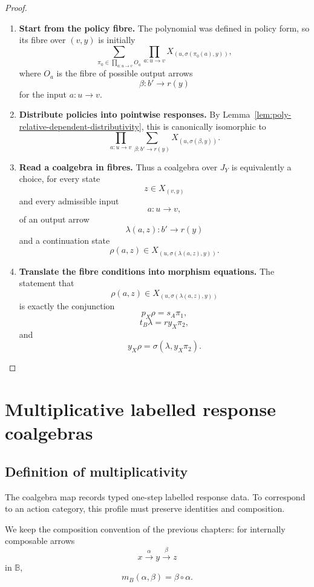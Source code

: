 \begin{proof}
\leavevmode
\begin{enumerate}
\item \textbf{Start from the policy fibre.}
The polynomial was defined in policy form, so its fibre over \((v,y)\) is
initially
\[
\sum_{\pi_0\in\prod_{a:u\to v}O_a}
\prod_{a:u\to v}
X_{(u,\sigma(\pi_0(a),y))},
\]
where \(O_a\) is the fibre of possible output arrows
\[
\beta:b'\to r(y)
\]
for the input \(a:u\to v\).

\item \textbf{Distribute policies into pointwise responses.}
By Lemma~\ref{lem:poly-relative-dependent-distributivity}, this is
canonically isomorphic to
\[
\prod_{a:u\to v}
\sum_{\beta:b'\to r(y)}
X_{(u,\sigma(\beta,y))}.
\]

\item \textbf{Read a coalgebra in fibres.}
Thus a coalgebra over \(J_Y\) is equivalently a choice, for every state
\[
z\in X_{(v,y)}
\]
and every admissible input
\[
a:u\to v,
\]
of an output arrow
\[
\lambda(a,z):b'\to r(y)
\]
and a continuation state
\[
\rho(a,z)\in X_{(u,\sigma(\lambda(a,z),y))}.
\]

\item \textbf{Translate the fibre conditions into morphism equations.}
The statement that
\[
\rho(a,z)\in X_{(u,\sigma(\lambda(a,z),y))}
\]
is exactly the conjunction
\[
p_X\rho=s_A\pi_1,
\]
\[
t_B\lambda=r y_X\pi_2,
\]
and
\[
y_X\rho=\sigma(\lambda,y_X\pi_2).
\]
\end{enumerate}
\end{proof}

\section{Multiplicative labelled response coalgebras}
\label{sec:poly-relative-multiplicative-coalgebras}

\subsection{Definition of multiplicativity}
\label{subsec:poly-relative-multiplicative-definition}

The coalgebra map records typed one-step labelled response data.  To correspond
to an action category, this profile must preserve identities and composition.

We keep the composition convention of the previous chapters: for internally
composable arrows
\[
x\xrightarrow{\alpha}y\xrightarrow{\beta}z
\]
in \(\mathbb B\),
\[
m_B(\alpha,\beta)=\beta\circ\alpha.
\]

